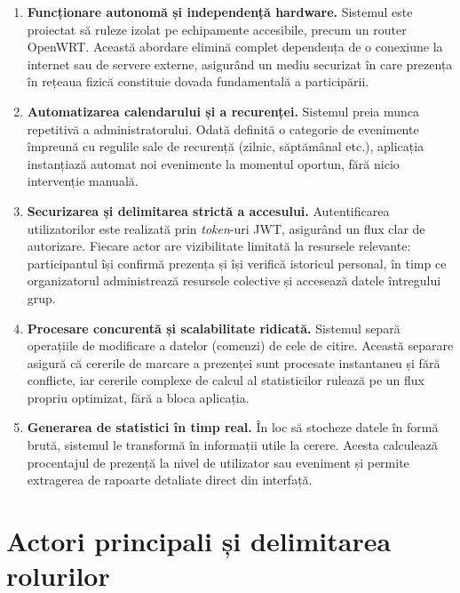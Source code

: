 \documentclass[a4paper,12pt,oneside]{report}
\begin{document}
\begin{enumerate}
[leftmargin=*,label=\textbf{O\arabic*.}]

    \item \textbf{Funcționare autonomă și independență hardware.}
    Sistemul este proiectat să ruleze \newline izolat pe echipamente accesibile, precum un
    router OpenWRT. Această abordare elimină complet dependența de o conexiune
    la internet sau de servere externe, asigurând
    un mediu securizat în care prezența în rețeaua fizică
    constituie dovada fundamentală a participării.
  

    \item \textbf{Automatizarea calendarului și a recurenței.}
    Sistemul preia
    munca repetitivă a administratorului. Odată definită o categorie de evenimente
    împreună cu regulile sale de recurență (zilnic, săptămânal etc.), aplicația
    instanțiază automat noi evenimente la momentul oportun, fără nicio intervenție
    manuală.

    \item \textbf{Securizarea și delimitarea strictă a accesului.}
    Autentificarea utilizatorilor este realizată prin \textit{token}-uri JWT, asigurând
    un flux clar de autorizare. Fiecare actor are vizibilitate limitată la resursele
    relevante: participantul își confirmă prezența și își verifică istoricul
    personal, în timp ce organizatorul administrează resursele colective și
    accesează datele întregului grup.

    \item \textbf{Procesare concurentă și scalabilitate ridicată.}
    Sistemul separă operațiile de modificare a datelor (comenzi) de cele de citire.
    Această separare asigură că cererile de marcare a
    prezenței sunt procesate instantaneu și fără conflicte, iar cererile complexe
    de calcul al statisticilor rulează pe un flux propriu optimizat, fără a bloca
    aplicația.
 

    \item \textbf{Generarea de statistici în timp real.}
    În loc să stocheze datele în formă brută, sistemul le transformă în informații
    utile la cerere. Acesta calculează procentajul de
    prezență la nivel de utilizator sau eveniment și permite extragerea de rapoarte
    detaliate direct din interfață.
  

\end{enumerate}



\section{Actori principali și delimitarea rolurilor}
\end{document}
